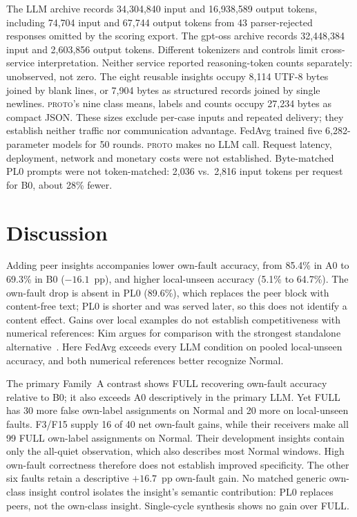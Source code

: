 \documentclass[conference]{IEEEtran}
\newcommand{\PROTO}{\textsc{proto}}
\newcommand{\cond}[1]{\textsf{#1}}
\begin{document}
The LLM archive records 34,304,840 input and 16,938,589 output tokens, including 74,704 input and 67,744 output tokens from 43 parser-rejected responses omitted by the scoring export. The gpt-oss archive records 32,448,384 input and 2,603,856 output tokens. Different tokenizers and controls limit cross-service interpretation. Neither service reported reasoning-token counts separately: unobserved, not zero. The eight reusable insights occupy 8,114 UTF-8 bytes joined by blank lines, or 7,904 bytes as structured records joined by single newlines. \PROTO{}'s nine class means, labels and counts occupy 27,234 bytes as compact JSON. These sizes exclude per-case inputs and repeated delivery; they establish neither traffic nor communication advantage. FedAvg trained five 6,282-parameter models for 50 rounds. \PROTO{} makes no LLM call. Request latency, deployment, network and monetary costs were not established. Byte-matched \cond{PL0} prompts were not token-matched: 2,036 vs.\ 2,816 input tokens per request for \cond{B0}, about 28\% fewer.

\section{Discussion}
\label{sec:discussion}
Adding peer insights accompanies lower own-fault accuracy, from 85.4\% in \cond{A0} to 69.3\% in \cond{B0} ($-16.1$~pp), and higher local-unseen accuracy (5.1\% to 64.7\%). The own-fault drop is absent in \cond{PL0} (89.6\%), which replaces the peer block with content-free text; \cond{PL0} is shorter and was served later, so this does not identify a content effect. Gains over local examples do not establish competitiveness with numerical references: Kim argues for comparison with the strongest standalone alternative~\cite{kim2026complementarity}. Here FedAvg exceeds every LLM condition on pooled local-unseen accuracy, and both numerical references better recognize Normal.

The primary Family~A contrast shows \cond{FULL} recovering own-fault accuracy relative to \cond{B0}; it also exceeds \cond{A0} descriptively in the primary LLM. Yet \cond{FULL} has 30 more false own-label assignments on Normal and 20 more on local-unseen faults. F3/F15 supply 16 of 40 net own-fault gains, while their receivers make all 99 \cond{FULL} own-label assignments on Normal. Their development insights contain only the all-quiet observation, which also describes most Normal windows. High own-fault correctness therefore does not establish improved specificity. The other six faults retain a descriptive $+16.7$~pp own-fault gain. No matched generic own-class insight control isolates the insight's semantic contribution: \cond{PL0} replaces peers, not the own-class insight. Single-cycle synthesis shows no gain over \cond{FULL}.
\end{document}
